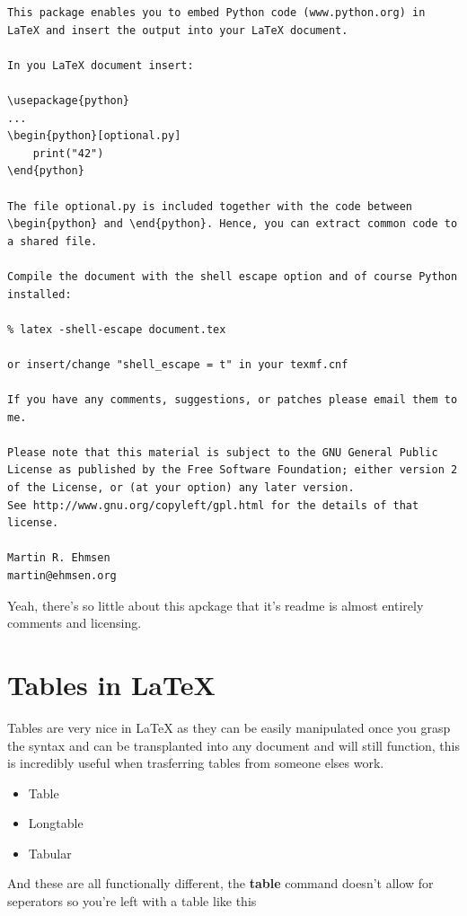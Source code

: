 \documentclass[12pt, letterpaper, oneside]{article} \usepackage[utf8]{inputenc}
\begin{document}
\begin{lstlisting}
This package enables you to embed Python code (www.python.org) in LaTeX and insert the output into your LaTeX document.

In you LaTeX document insert:

\usepackage{python}
...
\begin{python}[optional.py]
	print("42")
\end{python}

The file optional.py is included together with the code between \begin{python} and \end{python}. Hence, you can extract common code to a shared file.

Compile the document with the shell escape option and of course Python installed:

% latex -shell-escape document.tex

or insert/change "shell_escape = t" in your texmf.cnf

If you have any comments, suggestions, or patches please email them to me.

Please note that this material is subject to the GNU General Public License as published by the Free Software Foundation; either version 2 of the License, or (at your option) any later version.
See http://www.gnu.org/copyleft/gpl.html for the details of that license.

Martin R. Ehmsen
martin@ehmsen.org
\end{lstlisting}

Yeah, there's so little about this apckage that it's readme is almost entirely comments and licensing.

\section{Tables in \LaTeX{}}

Tables are very nice in \LaTeX{} as they can be easily manipulated once you grasp the syntax and can be transplanted into any document and will still function, this is incredibly useful when trasferring tables from someone elses work.

\begin{itemize}
	\item Table
	\item Longtable
	\item Tabular
\end{itemize}


And these are all functionally different, the \textbf{table} command doesn't allow for seperators so you're left with a table like this
\end{document}
